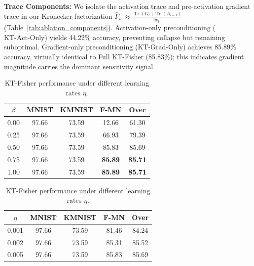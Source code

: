 \documentclass{article}
\theoremstyle{plain}
\theoremstyle{definition}
\theoremstyle{remark}
\begin{document}
\textbf{Trace Components:} We isolate the activation trace and pre-activation gradient trace in our Kronecker factorization \(\bar{F}_w \approx \frac{\operatorname{Tr}(G_l)\operatorname{Tr}(A_{l-1})}{|w_l|}\) (Table~\ref{tab:ablation_components}). Activation-only preconditioning (\(\text{KT-Act-Only}\)) yields 44.22\% accuracy, preventing collapse but remaining suboptimal. Gradient-only preconditioning (\(\text{KT-Grad-Only}\)) achieves 85.89\% accuracy, virtually identical to Full KT-Fisher (85.83\%); this indicates gradient magnitude carries the dominant sensitivity signal.

\begin{table}[t]
\begin{minipage}{0.32\textwidth}
\caption{KT-Fisher performance under different damping exponents \(\beta\).}
\label{tab:ablation_beta}
\vskip 0.15in
\begin{center}
\begin{small}
\begin{sc}
\begin{tabular}{ccccc}
\toprule
\(\beta\) & MNIST & KMNIST & F-MN & Over \\
\midrule
0.00 & 97.66 & 73.59 & 12.66 & 61.30 \\
0.25 & 97.66 & 73.59 & 66.93 & 79.39 \\
0.50 & 97.66 & 73.59 & 85.83 & 85.69 \\
0.75 & 97.66 & 73.59 & \textbf{85.89} & \textbf{85.71} \\
1.00 & 97.66 & 73.59 & \textbf{85.89} & \textbf{85.71} \\
\bottomrule
\end{tabular}
\end{sc}
\end{small}
\end{center}
\end{minipage}
\hfill
\begin{minipage}{0.32\textwidth}
\caption{KT-Fisher performance under different learning rates \(\eta\).}
\label{tab:ablation_lr}
\vskip 0.15in
\begin{center}
\begin{small}
\begin{sc}
\begin{tabular}{ccccc}
\toprule
\(\eta\) & MNIST & KMNIST & F-MN & Over \\
\midrule
0.001 & 97.66 & 73.59 & 81.46 & 84.24 \\
0.002 & 97.66 & 73.59 & 85.31 & 85.52 \\
0.005 & 97.66 & 73.59 & 85.83 & 85.69 \\

\end{tabular}
\end{sc}
\end{small}
\end{center}
\end{minipage}
\end{table}
\end{document}

